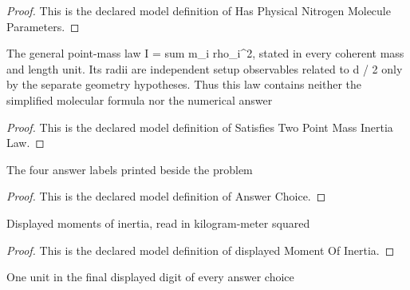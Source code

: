 \begin{proof}
  This is the declared model definition of Has Physical Nitrogen Molecule Parameters.
\end{proof}
\begin{definition}
  \label{def:physics:phyx-mini-0335:phyxminiproblems-problemphyxmini0335-satisfiestwopointmassinertialaw}
  The general point-mass law I = sum m\_i rho\_i\textasciicircum{}2, stated in every coherent mass and length unit. Its radii are independent setup observables related to d / 2 only by the separate geometry hypotheses. Thus this law contains neither the simplified molecular formula nor the numerical answer
\end{definition}
\begin{proof}
  This is the declared model definition of Satisfies Two Point Mass Inertia Law.
\end{proof}
\begin{definition}
  \label{def:physics:phyx-mini-0335:phyxminiproblems-problemphyxmini0335-answerchoice}
  The four answer labels printed beside the problem
\end{definition}
\begin{proof}
  This is the declared model definition of Answer Choice.
\end{proof}
\begin{definition}
  \label{def:physics:phyx-mini-0335:phyxminiproblems-problemphyxmini0335-displayedmomentofinertia}
  Displayed moments of inertia, read in kilogram-meter squared
\end{definition}
\begin{proof}
  This is the declared model definition of displayed Moment Of Inertia.
\end{proof}
\begin{definition}
  \label{def:physics:phyx-mini-0335:phyxminiproblems-problemphyxmini0335-displayedresolution}
  One unit in the final displayed digit of every answer choice
\end{definition}
